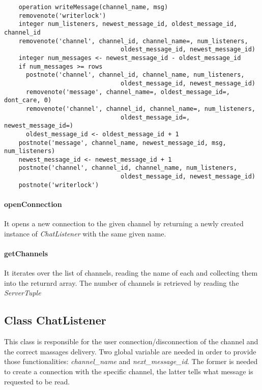 \documentclass[10pt,a4paper]{article}
\begin{document}
\small
\begin{verbatim}
	operation writeMessage(channel_name, msg)
	removenote('writerlock')
	integer num_listeners, newest_message_id, oldest_message_id, channel_id
	removenote('channel', channel_id, channel_name=, num_listeners,
                                oldest_message_id, newest_message_id)
	integer num_messages <- newest_message_id - oldest_message_id
	if num_messages >= rows
	  postnote('channel', channel_id, channel_name, num_listeners,
                                oldest_message_id, newest_message_id)
	  removenote('message', channel_name=, oldest_message_id=, dont_care, 0)
	  removenote('channel', channel_id, channel_name=, num_listeners,
                                oldest_message_id=, newest_message_id=)
	  oldest_message_id <- oldest_message_id + 1
	postnote('message', channel_name, newest_message_id, msg, num_listeners)
	newest_message_id <- newest_message_id + 1
	postnote('channel', channel_id, channel_name, num_listeners,
                                oldest_message_id, newest_message_id)
	postnote('writerlock')
\end{verbatim}
\normalsize

\paragraph{openConnection} It opens a new connection to the given channel by returning a newly created instance of \textit{ChatListener} with the same given name.

\paragraph{getChannels} It iterates over the list of channels, reading the name of each and collecting them into the returnrd array. The number of channels is retrieved by reading the \textit{ServerTuple}

\subsection{Class ChatListener}

This class is responsible for the user connection/disconnection of the channel and the correct massages delivery. Two global variable are needed in order to provide those functionalities: \textit{channel\_name} and \textit{next\_message\_id}. The former is needed to create a connection with the specific channel, the latter tells what message is requested to be read.
\end{document}
